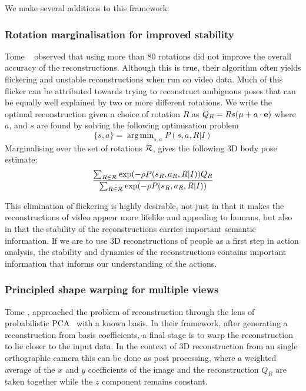 \documentclass[10pt,twocolumn,letterpaper]{article}
\DeclareMathOperator*{\argmin}{arg\,min}
\newcommand{\rec}{Q}
\begin{document}
 We make several additions to this framework:
 \subsubsection{Rotation marginalisation for improved stability}
 Tome \etal ~\cite{tome2017lifting} observed that using more than $80$ rotations did not improve the
 overall accuracy of the reconstructions. Although this is true, their algorithm
 often yields flickering and unstable reconstructions when run on video data.
 Much of this flicker can be attributed towards trying to reconstruct ambiguous
 poses that can be equally well explained by two or more different rotations.
 We write the optimal reconstruction given a choice of rotation $R$ as \mbox{$\rec_R=R s(\mu + a \cdot {\bf e})$} where $a$, and $s$ are
 found by solving the following optimisation problem
 \begin{equation}
   \{s,a\}= \argmin_{s,a} P(s,a,R|I)
   \label{eq:minpose}
 \end{equation}
 Marginalising over the set of rotations $\cal R$, gives the following 3D body pose estimate:
 \begin{equation}
  \frac{\sum_{R\in \cal R}\exp(-\rho P(s_R,a_R,R|I))\rec_R}
  {\sum_{R\in \cal R}\exp(-\rho P(s_{R},a_{R},R|I))}
  \label{eq:average}
 \end{equation}


This elimination of flickering is highly desirable, not just in that it makes
the reconstructions of video appear more lifelike and appealing to humans, but
also in that the stability of the reconstructions carries important semantic
information. If we are to use 3D reconstructions of people as a first step in
action analysis, the stability and dynamics of the reconstructions contains
important information that informs our understanding of the actions.
\subsubsection{Principled shape warping for multiple views}
Tome \etal \cite{tome2017lifting}, approached the problem of reconstruction through the lens of
probabilistic PCA~\cite{Tipping99probabilisticprincipal} with a known basis. In
their framework, after generating a reconstruction from basis coefficients, a
final stage is to warp the reconstruction to lie closer to the input data. In
the context of 3D reconstruction from an single orthographic camera this can be
done as post processing, where a weighted average of the $x$ and $y$ coefficients
of the image and the reconstruction $\rec_R$ are taken together while the
$z$ component remains constant.
\end{document}
